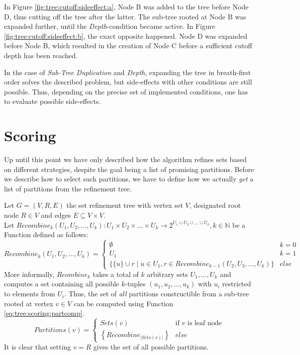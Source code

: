 			In Figure \ref{fig:tree:cutoff:sideeffect:a}, Node B was added to the tree before Node D, thus cutting off the tree after the latter.
			The sub-tree rooted at Node B was expanded further, until the \textit{Depth}-condition became active.
			In Figure \ref{fig:tree:cutoff:sideeffect:b}, the exact opposite happened. Node D was expanded before Node B, which resulted in the creation of Node C before a sufficient cutoff depth has been reached.

			In the case of \textit{Sub-Tree Duplication} and \textit{Depth}, expanding the tree in breath-first order solves the described problem, but side-effects with other conditions are still possible. Thus, depending on the precise set of implemented conditions, one has to evaluate possible side-effects.

	\clearpage

	\section{Scoring}
	\label{chap:gcg:scoring}

		Up until this point we have only described how the algorithm refines sets based on different strategies, despite the goal being a list of promising partitions.
		Before we describe how to select such partitions, we have to define how we actually \textit{get} a list of partitions from the refinement tree.

		Let $G = (V, R, E)$ the set refinement tree with vertex set $V$, designated root node $R \in V$ and edges $E \subseteq V \times V$. \\
		Let $Recombine_k(U_1, U_2, \ldots, U_k): U_1 \times U_2 \times \ldots \times U_k \xrightarrow{} 2^{U_1 \cup U_2 \cup \ldots \cup U_k}, k \in \mathbb{N}$ be a Function defined as follows:
		\begin{equation*}
			Recombine_k(U_1, U_2, \ldots, U_k) = \begin{cases}
				\emptyset & k = 0 \\
				U_1 & k = 1 \\
				\{ \{ u \} \cup r \mid u \in U_1, r \in Recombine_{k-1}(U_2, U_3, \ldots, U_k) \} & else
			\end{cases}
		\end{equation*}
		More informally, $Reombine_k$ takes a total of $k$ arbitrary sets $U_1, \ldots, U_k$ and computes a set containing all possible $k$-tuples $(u_1, u_2, \ldots, u_k)$ with $u_i$ restricted to elements from $U_i$.
		Thus, the set of \textit{all} partitions constructible from a sub-tree rooted at vertex $v \in V$ can be computed using Function \ref{eq:tree:scoring:partcomp}.
		\begin{equation}
		\label{eq:tree:scoring:partcomp}
			Partitions(v) = \begin{cases}
				Sets(v) & \text{if $v$ is leaf node} \\
				\left\{ Recombine_{|Sets(v)|} \right\} & else
			\end{cases}
		\end{equation}
		It is clear that setting $v = R$ gives the set of all possible partitions.

